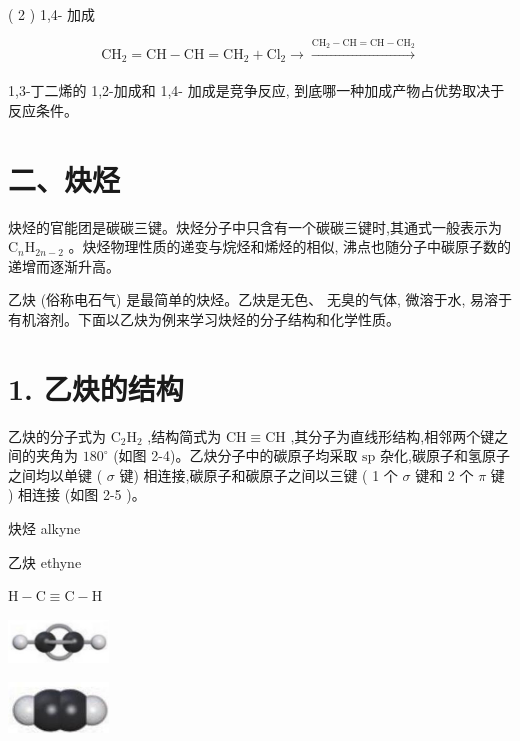 \documentclass[10pt]{article}
\begin{document}
( 2 ) 1,4- 加成

\[
{\mathrm{{CH}}}_{2} = \mathrm{{CH}} - \mathrm{{CH}} = {\mathrm{{CH}}}_{2} + {\mathrm{{Cl}}}_{2} \rightarrow \xrightarrow[]{{\mathrm{{CH}}}_{2} - \mathrm{{CH}} = \mathrm{{CH}} - {\mathrm{{CH}}}_{2}}
\]

1,3-丁二烯的 1,2-加成和 1,4- 加成是竞争反应, 到底哪一种加成产物占优势取决于反应条件。

\section*{二、炔烃}

炔烃的官能团是碳碳三键。炔烃分子中只含有一个碳碳三键时,其通式一般表示为 \({\mathrm{C}}_{n}{\mathrm{H}}_{{2n} - 2}\) 。炔烃物理性质的递变与烷烃和烯烃的相似, 沸点也随分子中碳原子数的递增而逐渐升高。

乙炔 (俗称电石气) 是最简单的炔烃。乙炔是无色、 无臭的气体, 微溶于水, 易溶于有机溶剂。下面以乙炔为例来学习炔烃的分子结构和化学性质。

\section*{1. 乙炔的结构}

乙炔的分子式为 \({\mathrm{C}}_{2}{\mathrm{H}}_{2}\) ,结构简式为 \(\mathrm{{CH}} \equiv \mathrm{{CH}}\) ,其分子为直线形结构,相邻两个键之间的夹角为 \({180}^{ \circ }\) (如图 2-4)。乙炔分子中的碳原子均采取 \(\mathrm{{sp}}\) 杂化,碳原子和氢原子之间均以单键 ( \(\sigma\) 键) 相连接,碳原子和碳原子之间以三键 ( 1 个 \(\sigma\) 键和 2 个 \(\pi\) 键 ) 相连接 (如图 2-5 )。

\begin{mdframed}

炔烃 alkyne

乙炔 ethyne

\end{mdframed}

\(\mathrm{H} - \mathrm{C} \equiv \mathrm{C} - \mathrm{H}\)

\begin{center}
\includegraphics[max width=0.2\textwidth]{images/0190efc5-b58a-7c43-bfb0-e0a030df9cfd_42_824711.jpg}
\end{center}

\begin{center}
\includegraphics[max width=0.2\textwidth]{images/0190efc5-b58a-7c43-bfb0-e0a030df9cfd_42_406361.jpg}
\end{center}
\end{document}
